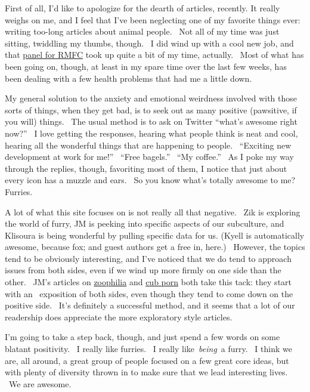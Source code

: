 First of all, I'd like to apologize for the dearth of articles,
recently. It really weighs on me, and I feel that I've been neglecting
one of my favorite things ever: writing too-long articles about animal
people. ~Not all of my time was just sitting, twiddling my thumbs,
though. ~I did wind up with a cool new job, and that
\href{http://adjectivespecies.com/2012/08/16/exploring-the-fandom-through-data-rmfc-2012-panel/}{panel
for RMFC} took up quite a bit of my time, actually. ~Most of what has
been going on, though, at least in my spare time over the last few
weeks, has been dealing with a few health problems that had me a little
down.

My general solution to the anxiety and emotional weirdness involved with
those sorts of things, when they get bad, is to seek out as many
positive (pawsitive, if you will) things. ~The usual method is to ask on
Twitter ``what's awesome right now?'' ~I love getting the responses,
hearing what people think is neat and cool, hearing all the wonderful
things that are happening to people. ~``Exciting new development at work
for me!'' ~``Free bagels.'' ~``My coffee.'' ~As I poke my way through
the replies, though, favoriting most of them, I notice that just about
every icon has a muzzle and ears. ~So you know what's totally awesome to
me? Furries.

A lot of what this site focuses on is not really all that negative. ~Zik
is exploring the world of furry, JM is peeking into specific aspects of
our subculture, and Klisoura is being wonderful by pulling specific data
for us. (Kyell is automatically awesome, because fox; and guest authors
get a free in, here.) ~However, the topics tend to be obviously
interesting, and I've noticed that we do tend to approach issues from
both sides, even if we wind up more firmly on one side than the other.
~JM's articles on
\href{http://adjectivespecies.com/2012/02/06/zoophilia-in-the-furry-community/}{zoophilia}
and
\href{http://adjectivespecies.com/2012/07/16/in-defence-of-cub-porn/}{cub
porn} both take this tack: they start with an ~exposition of both sides,
even though they tend to come down on the positive side. ~It's
definitely a successful method, and it seems that a lot of our
readership does appreciate the more exploratory style articles.

I'm going to take a step back, though, and just spend a few words on
some blatant positivity. ~I really like furries. ~I really
like~\emph{being}~a furry. ~I think we are, all around, a great group of
people focused on a few great core ideas, but with plenty of diversity
thrown in to make sure that we lead interesting lives. ~We are awesome.

